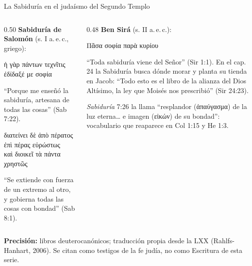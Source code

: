 \documentclass[hyperref={bookmarks=false},aspectratio=169]{beamer}
\newcommand{\grc}[1]{\foreignlanguage{ancientgreek}{#1}}
\newcommand{\precision}[1]{{\footnotesize\color{gris}\textbf{Precisión:} #1}}
\begin{document}
\begin{frame}{La Sabiduría en el judaísmo del Segundo Templo}
\begin{columns}[t,onlytextwidth]
\begin{column}{0.50\textwidth}\small
\textbf{Sabiduría de Salomón} (s. I a.\,e.\,c., griego):
\begin{center}\grc{ἡ γὰρ πάντων τεχνῖτις ἐδίδαξέ με σοφία}\end{center}
``Porque me enseñó la sabiduría, artesana de todas las cosas'' (Sab 7:22).
\begin{center}\grc{διατείνει δὲ ἀπὸ πέρατος ἐπὶ πέρας εὐρώστως}\\ \grc{καὶ διοικεῖ τὰ πάντα χρηστῶς}\end{center}
``Se extiende con fuerza de un extremo al otro, y gobierna todas las cosas con bondad'' (Sab 8:1).
\end{column}
\begin{column}{0.48\textwidth}\small
\textbf{Ben Sirá} (s. II a.\,e.\,c.):
\begin{center}\grc{Πᾶσα σοφία παρὰ κυρίου}\end{center}
``Toda sabiduría viene del Señor'' (Sir 1:1). En el cap. 24 la Sabiduría busca dónde morar y planta su tienda en Jacob: ``Todo esto es el libro de la alianza del Dios Altísimo, la ley que Moisés nos prescribió'' (Sir 24:23).\par\medskip
\scriptsize \emph{Sabiduría} 7:26 la llama ``resplandor (\grc{ἀπαύγασμα}) de la luz eterna\ldots{} e imagen (\grc{εἰκών}) de su bondad'': vocabulario que reaparece en Col 1:15 y He 1:3.
\end{column}
\end{columns}
\precision{libros deuterocanónicos; traducción propia desde la LXX (Rahlfs-Hanhart, 2006). Se citan como testigos de la fe judía, no como Escritura de esta serie.}
\end{frame}
\end{document}
